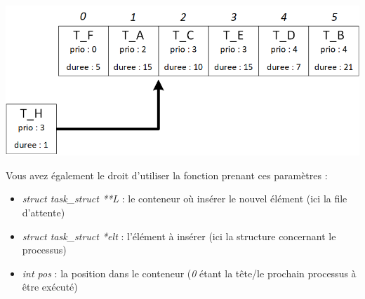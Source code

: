 \documentclass[11pt,a4paper]{article}
\begin{document}
\begin{center}
\includegraphics[scale=1.25]{./img/example_scheduling.png}
\end{center}


\medskip


%
\noindent Vous avez également le droit d'utiliser la fonction  prenant ces paramètres : \linebreak

\noindent {}
\begin{itemize}
\item \textit{struct task\_struct **L} : le conteneur où insérer le nouvel élément (ici la file d'attente)
\item \textit{struct task\_struct *elt} : l'élément à insérer (ici la structure concernant le processus)
\item \textit{int pos} : la position dans le conteneur (\textit{0} étant la tête/le prochain processus à être exécuté)
\end{itemize}


\end{document}
